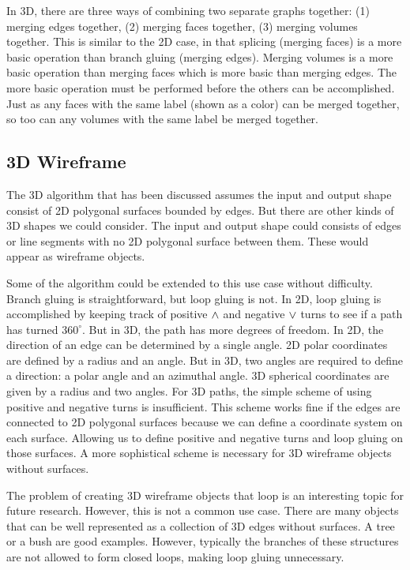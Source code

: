 \documentclass[acmtog]{acmart}
\begin{document}
In 3D, there are three ways of combining two separate graphs together:
(1) merging edges together, (2) merging faces together, (3) merging volumes
together. This is similar to the 2D case, in that splicing (merging faces) is a
more basic operation than branch gluing (merging edges). Merging volumes is a
more basic operation than merging faces which is more basic than merging edges.
The more basic operation must be performed before the others can be
accomplished. Just as any faces with the same label (shown as a color) can be
merged together, so too can any volumes with the same label be merged together.

\subsection{3D Wireframe}

The 3D algorithm that has been discussed assumes the input and output shape 
consist of 2D polygonal surfaces bounded by edges. But there are other kinds of
3D shapes we could consider. The input and output shape could consists of edges
or line segments with no 2D polygonal surface between them. These would appear
as wireframe objects.

Some of the algorithm could be extended to this use case without difficulty. 
Branch gluing is straightforward, but loop gluing is not. In 2D, loop gluing 
is accomplished by keeping track of positive ${\wedge}$ and negative ${\vee}$ turns 
to see if a path has turned $360^{\circ}$. But in 3D, the path has more 
degrees of freedom. In 2D, the direction of an edge can be determined by a 
single angle. 2D polar coordinates are defined by a radius and an angle. But 
in 3D, two angles are required to define a direction: a polar angle and an 
azimuthal angle. 3D spherical coordinates are given by a radius and two 
angles. For 3D paths, the simple scheme of using positive and negative 
turns is insufficient. This scheme works fine if the edges are connected to 2D
polygonal surfaces because we can define a coordinate system on each
surface. Allowing us to define positive and negative turns and loop gluing on those 
surfaces. A more sophistical scheme is necessary for 3D wireframe objects 
without surfaces.

The problem of creating 3D wireframe objects that loop is an interesting 
topic for future research. However, this is not a common use case. There are 
many objects that can be well represented as a collection of 3D edges without 
surfaces. A tree or a bush are good examples. However, typically the branches 
of these structures are not allowed to form closed loops, making loop gluing 
unnecessary.
\end{document}
